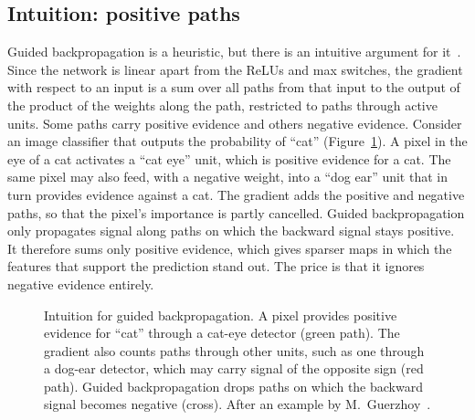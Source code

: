 \subsection{Intuition: positive paths}

Guided backpropagation is a heuristic, but there is an intuitive argument for it~\citep{guerzhoy_video}. Since the network is linear apart from the ReLUs and max switches, the gradient with respect to an input is a sum over all paths from that input to the output of the product of the weights along the path, restricted to paths through active units. Some paths carry positive evidence and others negative evidence. Consider an image classifier that outputs the probability of ``cat'' (Figure~\ref{fig:positive_paths}). A pixel in the eye of a cat activates a ``cat eye'' unit, which is positive evidence for a cat. The same pixel may also feed, with a negative weight, into a ``dog ear'' unit that in turn provides evidence against a cat. The gradient adds the positive and negative paths, so that the pixel's importance is partly cancelled. Guided backpropagation only propagates signal along paths on which the backward signal stays positive. It therefore sums only positive evidence, which gives sparser maps in which the features that support the prediction stand out. The price is that it ignores negative evidence entirely.

\begin{figure}[t]
  \centering
  \caption{Intuition for guided backpropagation. A pixel provides positive evidence for ``cat'' through a cat-eye detector (green path). The gradient also counts paths through other units, such as one through a dog-ear detector, which may carry signal of the opposite sign (red path). Guided backpropagation drops paths on which the backward signal becomes negative (cross). After an example by M.~Guerzhoy~\citep{guerzhoy_video}.}
  \label{fig:positive_paths}
\end{figure}


